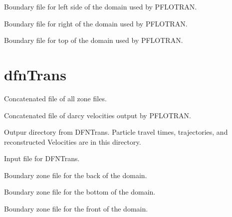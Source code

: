 \documentclass[letterpaper,10pt,english]{sphinxmanual}
\begin{document}

\label{\detokenize{output:pboundary-left-w-ex}}
Boundary file for left side of the domain used by PFLOTRAN.


\label{\detokenize{output:pboundary-right-e-ex}}
Boundary file for right of the domain used by PFLOTRAN.


\label{\detokenize{output:pboundary-top-ex}}
Boundary file for top of the domain used by PFLOTRAN.


\section{dfnTrans}
\label{\detokenize{output:dfntrans}}

\label{\detokenize{output:allboundaries-zone}}
Concatenated file of all zone files.


\label{\detokenize{output:darcyvel-dat}}
Concatenated file of darcy velocities output by PFLOTRAN.


\label{\detokenize{output:dfntrans-output-dir}}
Outpur directory from DFNTrans. Particle travel times, trajectories, and reconstructed Velocities are in this directory.


\label{\detokenize{output:ptdfn-control-dat}}
Input file for DFNTrans.


\label{\detokenize{output:pboundary-back-n-zone}}
Boundary zone file for the back of the domain.


\label{\detokenize{output:pboundary-bottom-zone}}
Boundary zone file for the bottom of the domain.


\label{\detokenize{output:pboundary-front-s-zone}}
Boundary zone file for the front of the domain.
\end{document}
